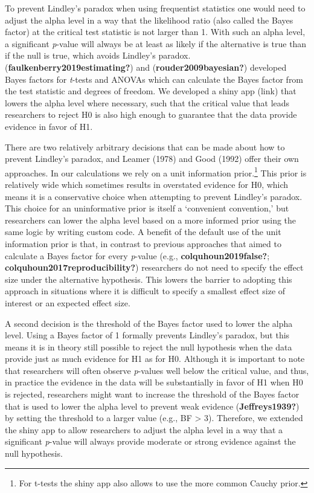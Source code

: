 \documentclass[
  english,
  ,jou, a4paper,floatsintext]{apa6}
\begin{document}
To prevent Lindley's paradox when using frequentist statistics one would need to adjust the alpha level in a way that the likelihood ratio (also called the Bayes factor) at the critical test statistic is not larger than 1. With such an alpha level, a significant \emph{p}-value will always be at least as likely if the alternative is true than if the null is true, which avoids Lindley's paradox. (\textbf{faulkenberry2019estimating?}) and (\textbf{rouder2009bayesian?}) developed Bayes factors for \emph{t}-tests and ANOVAs which can calculate the Bayes factor from the test statistic and degrees of freedom. We developed a shiny app (link) that lowers the alpha level where necessary, such that the critical value that leads researchers to reject H0 is also high enough to guarantee that the data provide evidence in favor of H1.

There are two relatively arbitrary decisions that can be made about how to prevent Lindley's paradox, and Leamer (1978) and Good (1992) offer their own approaches. In our calculations we rely on a unit information prior.\footnote{For t-tests the shiny app also allows to use the more common Cauchy prior.} This prior is relatively wide which sometimes results in overstated evidence for H0, which means it is a conservative choice when attempting to prevent Lindley's paradox. This choice for an uninformative prior is itself a `convenient convention,' but researchers can lower the alpha level based on a more informed prior using the same logic by writing custom code. A benefit of the default use of the unit information prior is that, in contrast to previous approaches that aimed to calculate a Bayes factor for every \emph{p}-value (e.g., \textbf{colquhoun2019false?}; \textbf{colquhoun2017reproducibility?}) researchers do not need to specify the effect size under the alternative hypothesis. This lowers the barrier to adopting this approach in situations where it is difficult to specify a smallest effect size of interest or an expected effect size.

A second decision is the threshold of the Bayes factor used to lower the alpha level. Using a Bayes factor of 1 formally prevents Lindley's paradox, but this means it is in theory still possible to reject the null hypothesis when the data provide just as much evidence for H1 as for H0. Although it is important to note that researchers will often observe \emph{p}-values well below the critical value, and thus, in practice the evidence in the data will be substantially in favor of H1 when H0 is rejected, researchers might want to increase the threshold of the Bayes factor that is used to lower the alpha level to prevent weak evidence (\textbf{Jeffreys1939?}) by setting the threshold to a larger value (e.g., BF \textgreater{} 3). Therefore, we extended the shiny app to allow researchers to adjust the alpha level in a way that a significant \emph{p}-value will always provide moderate or strong evidence against the null hypothesis.
\end{document}
